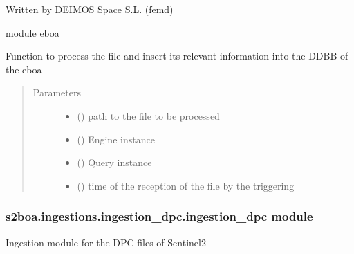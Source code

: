 Written by DEIMOS Space S.L. (femd)

module eboa

\begin{fulllineitems}
\label{\detokenize{s2boa.ingestions:s2boa.ingestions.ingestion_dhus.ingestion_dhus.process_file}}
Function to process the file and insert its relevant information
into the DDBB of the eboa
\begin{quote}\begin{description}
\item[{Parameters}] \leavevmode\begin{itemize}
\item {} 
 () \textendash{} path to the file to be processed

\item {} 
 () \textendash{} Engine instance

\item {} 
 () \textendash{} Query instance

\item {} 
 () \textendash{} time of the reception of the file by the triggering

\end{itemize}

\end{description}\end{quote}

\end{fulllineitems}



\subsubsection{s2boa.ingestions.ingestion\_dpc.ingestion\_dpc module}
\label{\detokenize{s2boa.ingestions:module-s2boa.ingestions.ingestion_dpc.ingestion_dpc}}\label{\detokenize{s2boa.ingestions:s2boa-ingestions-ingestion-dpc-ingestion-dpc-module}}
Ingestion module for the DPC files of Sentinel\sphinxhyphen{}2

